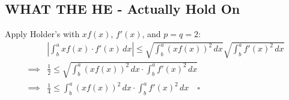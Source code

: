 \documentclass[12pt]{article}
\begin{document}
\subsection{WHAT THE HE - Actually Hold On}

Apply Holder's with $xf(x)$, $f'(x)$, and $p=q=2$:
\begin{align*}
  & \left|\int_{b}^{a} xf(x) \cdot f'(x)\,dx\right| \le \sqrt{\int_{b}^{a} (xf(x))^2\,dx}\sqrt{\int_{b}^{a} f'(x)^2\,dx} \\
  \implies{} & \frac{1}{2} \le \sqrt{\int_{b}^{a} (xf(x))^2\,dx \cdot \int_{b}^{a} f'(x)^2\,dx} \\
  \implies{} & \frac{1}{4} \le \int_{b}^{a} (xf(x))^2\,dx \cdot \int_{b}^{a} f'(x)^2\,dx\quad\square
\end{align*}
\end{document}
